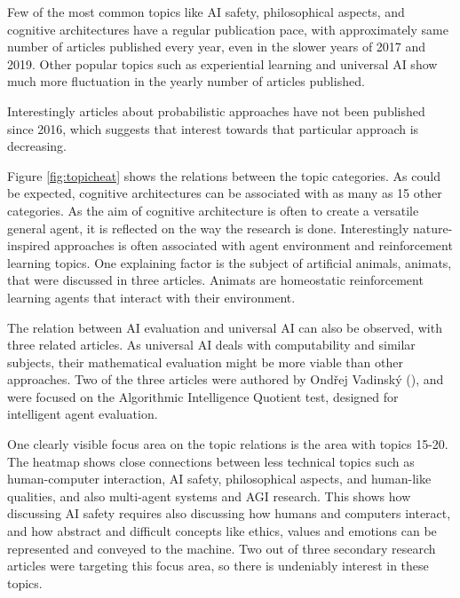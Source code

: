 \documentclass[utf8,english]{gradu3}
\begin{document}
Few of the most common topics like AI safety, philosophical aspects, and
cognitive architectures have a regular publication pace, with approximately same
number of articles published every year, even in the slower years of 2017 and
2019. Other popular topics such as experiential learning and universal AI show
much more fluctuation in the yearly number of articles published.

Interestingly articles about probabilistic approaches have not been published
since 2016, which suggests that interest towards that particular approach is
decreasing.



Figure \ref{fig:topicheat} shows the relations between the topic categories. As
could be expected, cognitive architectures can be associated with as many as 15
other categories. As the aim of cognitive architecture is often to create a
versatile general agent, it is reflected on the way the research is done.
Interestingly nature-inspired approaches is often associated with agent
environment and reinforcement learning topics. One explaining factor is the
subject of artificial animals, animats, that were discussed in three articles.
Animats are homeostatic reinforcement learning agents that interact with their
environment. 

The relation between AI evaluation and universal AI can also be observed, with
three related articles. As universal AI deals with computability and similar
subjects, their mathematical evaluation might be more viable than other
approaches. Two of the three articles were authored by Ond\v rej
Vadinsk\'y (\cite*{vadinsky2018lessons,vadinsky2018sema}), and were focused on the
Algorithmic Intelligence Quotient test, designed for intelligent agent
evaluation.

One clearly visible focus area on the topic relations is the area with topics
15-20. The heatmap shows close connections between less technical topics such as
human-computer interaction, AI safety, philosophical aspects, and human-like
qualities, and also multi-agent systems and AGI research. This shows how
discussing AI safety requires also discussing how humans and computers interact,
and how abstract and difficult concepts like ethics, values and emotions can be
represented and conveyed to the machine. Two out of three secondary research
articles were targeting this focus area, so there is undeniably interest in
these topics.
\end{document}
